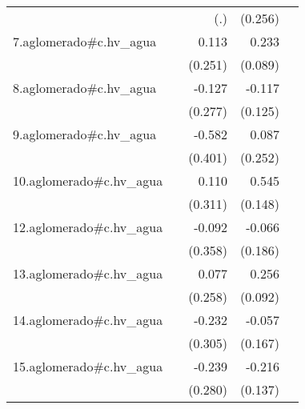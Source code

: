 {\begin{longtable}{l*{4}{D{.}{.}{-1}}}
            &                     &         (.)         &     (0.256)         &                     \\
\addlinespace
7.aglomerado#c.hv\_agua&                     &       0.113         &       0.233\sym{**} &                     \\
            &                     &     (0.251)         &     (0.089)         &                     \\
\addlinespace
8.aglomerado#c.hv\_agua&                     &      -0.127         &      -0.117         &                     \\
            &                     &     (0.277)         &     (0.125)         &                     \\
\addlinespace
9.aglomerado#c.hv\_agua&                     &      -0.582         &       0.087         &                     \\
            &                     &     (0.401)         &     (0.252)         &                     \\
\addlinespace
10.aglomerado#c.hv\_agua&                     &       0.110         &       0.545\sym{***}&                     \\
            &                     &     (0.311)         &     (0.148)         &                     \\
\addlinespace
12.aglomerado#c.hv\_agua&                     &      -0.092         &      -0.066         &                     \\
            &                     &     (0.358)         &     (0.186)         &                     \\
\addlinespace
13.aglomerado#c.hv\_agua&                     &       0.077         &       0.256\sym{**} &                     \\
            &                     &     (0.258)         &     (0.092)         &                     \\
\addlinespace
14.aglomerado#c.hv\_agua&                     &      -0.232         &      -0.057         &                     \\
            &                     &     (0.305)         &     (0.167)         &                     \\
\addlinespace
15.aglomerado#c.hv\_agua&                     &      -0.239         &      -0.216         &                     \\
            &                     &     (0.280)         &     (0.137)         &                     \\

\end{longtable}}
